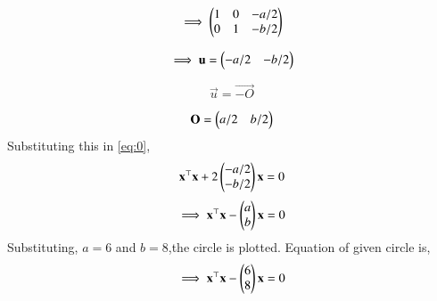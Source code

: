 \documentclass[journal,12pt,twocolumn]{IEEEtran}
\begin{document}
\begin{equation}
  \implies \begin{pmatrix}1 & 0 & -a/2 \\ 0& 1 & -b/2\end{pmatrix}
\end{equation}


\begin{equation}
    \implies \mathbf{u}=\begin{pmatrix}-a/2 & -b/2\end{pmatrix} 
\end{equation}

\begin{equation}
    \vec{u} = \vec{-O}
\end{equation}

\begin{equation}
    \mathbf{O} = \begin{pmatrix}a/2 & b/2\end{pmatrix}
\end{equation}
Substituting this in \ref{eq:0},
\begin{equation}
    \mathbf{x^\top}\mathbf{x}+2\begin{pmatrix}-a/2 \\ -b/2\end{pmatrix}\mathbf{x}=0 
\end{equation}
\begin{equation}
   \implies \mathbf{x^\top}\mathbf{x}-\begin{pmatrix}a \\ b \end{pmatrix}\mathbf{x}=0
\end{equation}
Substituting, $a=6$ and $b=8$,the circle is plotted.
Equation of given circle is,
\begin{equation}
   \implies \mathbf{x^\top}\mathbf{x}-\begin{pmatrix}6 \\ 8 \end{pmatrix}\mathbf{x}=0
\end{equation}
\end{document}
